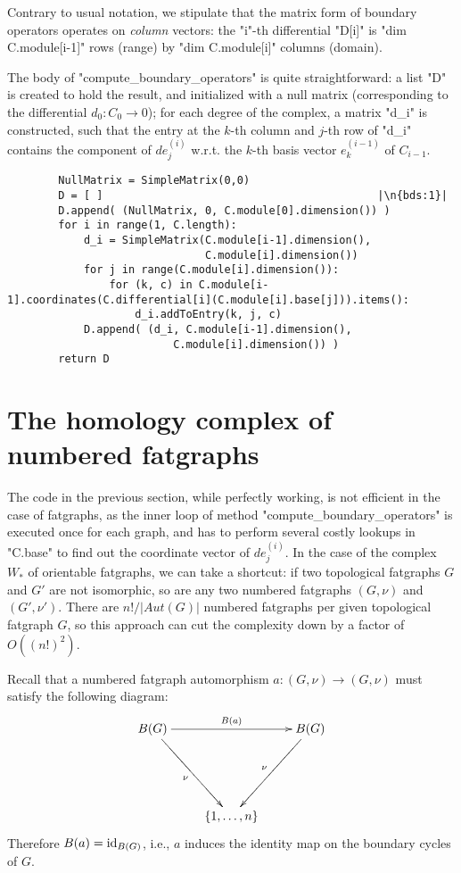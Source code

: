 Contrary to usual notation, we stipulate that the matrix form of
boundary operators operates on \emph{column} vectors: the "i"-th
differential "D[i]" is "dim C.module[i-1]" rows (range) by "dim
C.module[i]" columns (domain).

The body of "compute_boundary_operators" is quite straightforward: a
list "D" is created to hold the result, and initialized with a null
matrix (corresponding to the differential $d_0: C_0 \to 0$); for each
degree of the complex, a matrix "d_i" is constructed, such that the
entry at the $k$-th column and $j$-th row of "d_i" contains the
component of $de^{(i)}_j$ w.r.t. the $k$-th basis vector $e^{(i-1)}_k$
of $C_{i-1}$.
\begin{lstlisting}
        NullMatrix = SimpleMatrix(0,0)
        D = [ ]                                           |\n{bds:1}|
        D.append( (NullMatrix, 0, C.module[0].dimension()) )
        for i in range(1, C.length):
            d_i = SimpleMatrix(C.module[i-1].dimension(),
                               C.module[i].dimension())
            for j in range(C.module[i].dimension()):
                for (k, c) in C.module[i-1].coordinates(C.differential[i](C.module[i].base[j])).items():
                    d_i.addToEntry(k, j, c)
            D.append( (d_i, C.module[i-1].dimension(), 
                          C.module[i].dimension()) )
        return D

\end{lstlisting}


\section{The homology complex of numbered fatgraphs}
\label{sec:homology-numbered-fatgraphs}

The code in the previous section, while perfectly working, is not
efficient in the case of fatgraphs, as the inner loop of method
"compute_boundary_operators" is executed once for each graph, and has
to perform several costly lookups in "C.base" to find out the
coordinate vector of $de^{(i)}_j$.  In the case of the complex $W_*$
of orientable fatgraphs, we can take a shortcut: if two topological
fatgraphs $G$ and $G'$ are not isomorphic, so are any two numbered
fatgraphs $(G,\nu)$ and $(G',\nu')$.  There are $n! / |Aut(G)|$
numbered fatgraphs per given topological fatgraph $G$, so this
approach can cut the complexity down by a factor of $O((n!)^2)$.

Recall that a numbered fatgraph automorphism $a: (G,\nu) \to (G,\nu)$
must satisfy the following diagram:
\begin{equation*}
  \xymatrix{%
    \Holes{G} &  & \Holes{G}
    \\
    & &
    \\
    & \{ 1, \ldots, n \} &
    \ar^{\Holes{a}} "1,1";"1,3"
    \ar_{\nu} "1,1";"3,2"
    \ar_{\nu} "1,3";"3,2"
  }%
\end{equation*}
Therefore $B(a) = \operatorname{id}_{B(G)}$, i.e., $a$ induces the
identity map on the boundary cycles of $G$.

